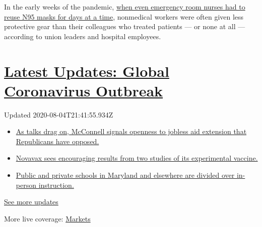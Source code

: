 In the early weeks of the pandemic,
\href{https://www.nytimes3xbfgragh.onion/2020/03/19/us/hospitals-coronavirus-ppe-shortage.html}{when
even emergency room nurses had to reuse N95 masks for days at a time},
nonmedical workers were often given less protective gear than their
colleagues who treated patients --- or none at all --- according to
union leaders and hospital employees.

\hypertarget{latest-updates-global-coronavirus-outbreak}{%
\section{\texorpdfstring{\href{https://www.nytimes3xbfgragh.onion/2020/08/04/world/coronavirus-cases.html?action=click\&pgtype=Article\&state=default\&region=MAIN_CONTENT_1\&context=storylines_live_updates}{Latest
Updates: Global Coronavirus
Outbreak}}{Latest Updates: Global Coronavirus Outbreak}}\label{latest-updates-global-coronavirus-outbreak}}

Updated 2020-08-04T21:41:55.934Z

\begin{itemize}
\tightlist
\item
  \href{https://www.nytimes3xbfgragh.onion/2020/08/04/world/coronavirus-cases.html?action=click\&pgtype=Article\&state=default\&region=MAIN_CONTENT_1\&context=storylines_live_updates\#link-2daa96b5}{As
  talks drag on, McConnell signals openness to jobless aid extension
  that Republicans have opposed.}
\item
  \href{https://www.nytimes3xbfgragh.onion/2020/08/04/world/coronavirus-cases.html?action=click\&pgtype=Article\&state=default\&region=MAIN_CONTENT_1\&context=storylines_live_updates\#link-1228a480}{Novavax
  sees encouraging results from two studies of its experimental
  vaccine.}
\item
  \href{https://www.nytimes3xbfgragh.onion/2020/08/04/world/coronavirus-cases.html?action=click\&pgtype=Article\&state=default\&region=MAIN_CONTENT_1\&context=storylines_live_updates\#link-4825b93}{Public
  and private schools in Maryland and elsewhere are divided over
  in-person instruction.}
\end{itemize}

\href{https://www.nytimes3xbfgragh.onion/2020/08/04/world/coronavirus-cases.html?action=click\&pgtype=Article\&state=default\&region=MAIN_CONTENT_1\&context=storylines_live_updates}{See
more updates}

More live coverage:
\href{https://www.nytimes3xbfgragh.onion/live/2020/08/04/business/stock-market-today-coronavirus?action=click\&pgtype=Article\&state=default\&region=MAIN_CONTENT_1\&context=storylines_live_updates}{Markets}

